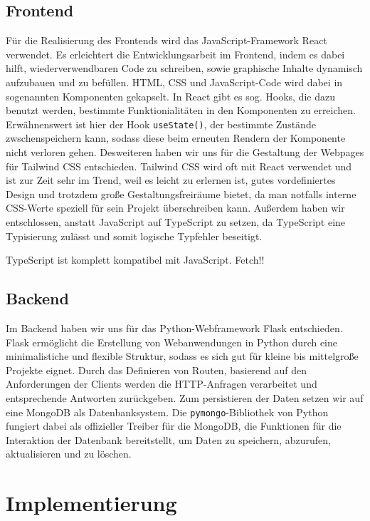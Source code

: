 \documentclass[conference,a4paper,flushend]{cs-techrep}
\begin{document}
\subsection{Frontend}
Für die Realisierung des Frontends wird das JavaScript-Framework React verwendet. Es erleichtert die Entwicklungsarbeit im Frontend, indem es dabei hilft, wiederverwendbaren Code zu schreiben, sowie graphische Inhalte dynamisch aufzubauen und zu befüllen. HTML, CSS und JavaScript-Code wird dabei in sogenannten Komponenten gekapselt. In React gibt es sog. Hooks, die dazu benutzt werden, bestimmte Funktionialitäten in den Komponenten zu erreichen. Erwähnenswert ist hier der Hook \texttt{useState()}, der bestimmte Zustände zwschenspeichern kann, sodass diese beim erneuten Rendern der Komponente nicht verloren gehen. Desweiteren haben wir uns für die Gestaltung der Webpages für Tailwind CSS entschieden. Tailwind CSS wird oft mit React verwendet und ist zur Zeit sehr im Trend, weil es leicht zu erlernen ist, gutes vordefiniertes Design und trotzdem große Gestaltungsfreiräume bietet, da man notfalls interne CSS-Werte speziell für sein Projekt überschreiben kann. Außerdem haben wir entschlossen, anstatt JavaScript auf TypeScript zu setzen, da TypeScript eine Typisierung zulässt und somit logische Typfehler beseitigt. 

TypeScript ist komplett kompatibel mit JavaScript.
Fetch!!


\subsection{Backend}
Im Backend haben wir uns für das Python-Webframework Flask entschieden. Flask ermöglicht die Erstellung von Webanwendungen in Python durch eine minimalistiche und flexible Struktur, sodass es sich gut für kleine bis mittelgroße Projekte eignet. Durch das Definieren von Routen, basierend auf den Anforderungen der Clients werden die HTTP-Anfragen verarbeitet und entsprechende Antworten zurückgeben. 
Zum persistieren der Daten setzen wir auf eine MongoDB als Datenbanksystem. Die \texttt{pymongo}-Bibliothek von Python fungiert dabei als offizieller Treiber für die MongoDB, die Funktionen für die Interaktion der Datenbank bereitstellt, um Daten zu speichern, abzurufen, aktualisieren und zu löschen.




\section{Implementierung}
\end{document}
